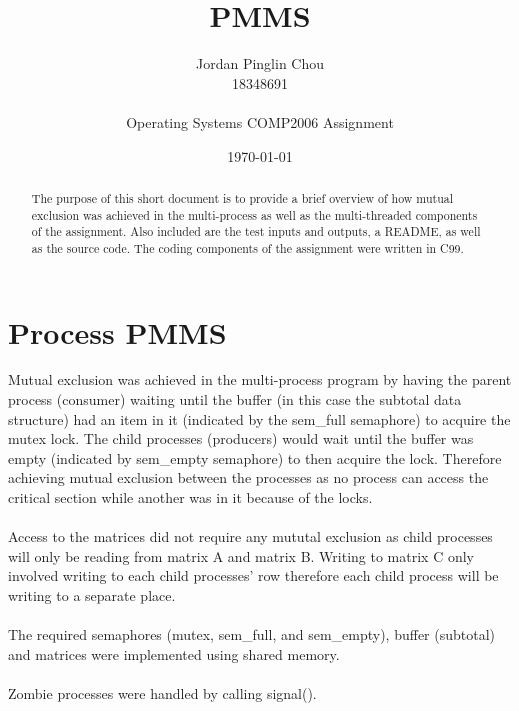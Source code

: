 \documentclass{article}
\begin{document}
\author{Jordan Pinglin Chou\\
  18348691\\\\
  Operating Systems COMP2006 Assignment\\}
\date{\today}
\title{PMMS}
\maketitle
\pagebreak
\begin{abstract}
  The purpose of this short document is to provide a brief overview of
  how mutual exclusion was achieved in the multi-process as well as
  the multi-threaded components of the assignment. Also included are
  the test inputs and outputs, a README, as well as the source code. The coding
  components of the assignment were written in C99.
\end{abstract}

\section{Process PMMS}
Mutual exclusion was achieved in the multi-process program by having the parent
process (consumer) waiting until the buffer (in this case the subtotal data structure)
had an item in it (indicated by the sem\_full semaphore) to acquire the mutex lock.
The child processes (producers) would wait until the buffer was empty (indicated
by sem\_empty semaphore) to then acquire the lock. Therefore achieving mutual
exclusion between the processes as no process can access the critical section
while another was in it because of the locks.
\\\\
Access to the matrices did not require any mututal exclusion as child processes
will only be reading from matrix A and matrix B. Writing to matrix C only
involved writing to each child processes’ row therefore each child process will
be writing to a separate place.
\\\\
The required semaphores (mutex, sem\_full, and sem\_empty), buffer (subtotal) and
matrices were implemented using shared memory.
\\\\
Zombie processes were handled by calling signal().
\end{document}
